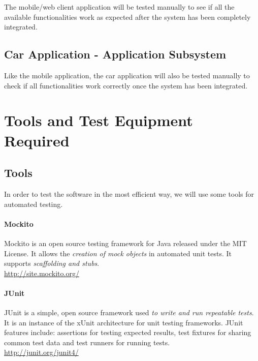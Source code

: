\documentclass[english]{article}
\begin{document}
The mobile/web client application will be tested manually to see if all the available functionalities work as expected after the system has been completely integrated.

\subsection{Car Application - Application Subsystem}

Like the mobile application, the car application will also be tested manually to check if all functionalities work correctly once the system has been integrated.

\newpage
\section{Tools and Test Equipment Required}

\subsection{Tools}


In order to test the software in the most efficient way, we will use some tools for automated testing.


\paragraph{Mockito}
Mockito is an open source testing framework for Java released under the MIT License. It allows the \emph{creation of mock objects} in automated unit tests.
It supports \emph{scaffolding and stubs}.\\
\url{http://site.mockito.org/}

\paragraph{JUnit}
JUnit is a simple, open source framework used \emph{to write and run repeatable tests}. It is an instance of the xUnit architecture for unit testing frameworks. JUnit features include: assertions for testing expected results, test fixtures for sharing common test data and test runners for running tests.\\
\url{http://junit.org/junit4/}
\end{document}
